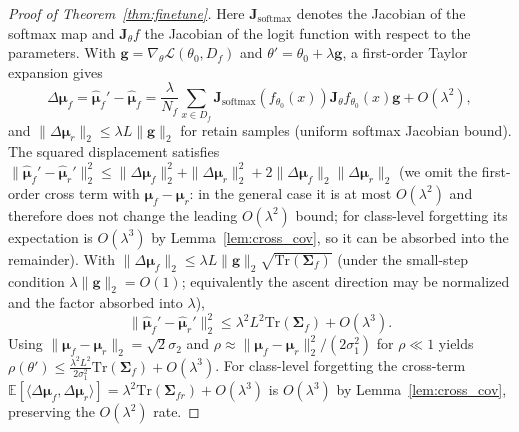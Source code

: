 \documentclass[smallextended]{svjour3}       %
\begin{document}
\begin{proof}[Proof of Theorem~\ref{thm:finetune}]
Here $\mathbf{J}_{\mathrm{softmax}}$ denotes the Jacobian of the softmax map and $\mathbf{J}_\theta f$ the Jacobian of the logit function with respect to the parameters. With $\mathbf{g}=\nabla_\theta\mathcal{L}(\theta_0,D_f)$ and $\theta'=\theta_0+\lambda\mathbf{g}$, a first-order Taylor expansion gives
\begin{equation}
\Delta\boldsymbol{\mu}_f=\hat{\boldsymbol{\mu}}_f'-\hat{\boldsymbol{\mu}}_f=\frac{\lambda}{N_f}\sum_{x\in D_f}\mathbf{J}_{\mathrm{softmax}}(f_{\theta_0}(x))\mathbf{J}_\theta f_{\theta_0}(x)\mathbf{g}+O(\lambda^2),
\end{equation}
and $\|\Delta\boldsymbol{\mu}_r\|_2\le\lambda L\|\mathbf{g}\|_2$ for retain samples (uniform softmax Jacobian bound). The squared displacement satisfies $\|\hat{\boldsymbol{\mu}}_f'-\hat{\boldsymbol{\mu}}_r'\|_2^2\le\|\Delta\boldsymbol{\mu}_f\|_2^2+\|\Delta\boldsymbol{\mu}_r\|_2^2+2\|\Delta\boldsymbol{\mu}_f\|_2\|\Delta\boldsymbol{\mu}_r\|_2$ (we omit the first-order cross term with $\boldsymbol{\mu}_f-\boldsymbol{\mu}_r$: in the general case it is at most $O(\lambda^2)$ and therefore does not change the leading $O(\lambda^2)$ bound; for class-level forgetting its expectation is $O(\lambda^3)$ by Lemma~\ref{lem:cross_cov}, so it can be absorbed into the remainder). With $\|\Delta\boldsymbol{\mu}_f\|_2\le\lambda L\|\mathbf{g}\|_2\sqrt{\mathrm{Tr}(\boldsymbol{\Sigma}_f)}$ (under the small-step condition $\lambda\|\mathbf{g}\|_2=O(1)$; equivalently the ascent direction may be normalized and the factor absorbed into $\lambda$),
\begin{equation}
\|\hat{\boldsymbol{\mu}}_f'-\hat{\boldsymbol{\mu}}_r'\|_2^2\le\lambda^2L^2\mathrm{Tr}(\boldsymbol{\Sigma}_f)+O(\lambda^3).
\end{equation}
Using $\|\boldsymbol{\mu}_f-\boldsymbol{\mu}_r\|_2=\sqrt{2}\sigma_2$ and $\rho\approx\|\boldsymbol{\mu}_f-\boldsymbol{\mu}_r\|_2^2/(2\sigma_1^2)$ for $\rho\ll1$ yields $\rho(\theta')\le\frac{\lambda^2L^2}{2\sigma_1^2}\mathrm{Tr}(\boldsymbol{\Sigma}_f)+O(\lambda^3)$. For class-level forgetting the cross-term $\mathbb{E}[\langle\Delta\boldsymbol{\mu}_f,\Delta\boldsymbol{\mu}_r\rangle]=\lambda^2\mathrm{Tr}(\boldsymbol{\Sigma}_{fr})+O(\lambda^3)$ is $O(\lambda^3)$ by Lemma~\ref{lem:cross_cov}, preserving the $O(\lambda^2)$ rate.
\end{proof}
\end{document}
